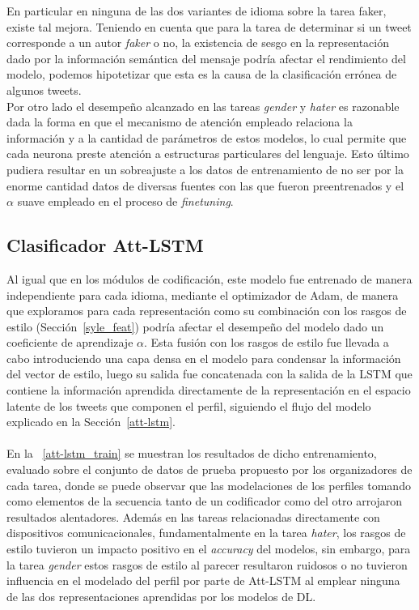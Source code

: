 	En particular en ninguna de las dos variantes de idioma sobre la tarea faker, existe tal mejora. Teniendo en cuenta que para la tarea de determinar si un tweet corresponde a un autor \textit{faker} o no, la existencia de sesgo en la representación dado por la información semántica del mensaje podría afectar el rendimiento del modelo, podemos hipotetizar que esta es la causa de la clasificación errónea de algunos tweets. \\
	Por otro lado el desempeño alcanzado en las tareas \textit{gender} y \textit{hater} es razonable dada la forma en que el mecanismo de atención empleado relaciona la información y a la cantidad de parámetros de estos modelos, lo cual permite que cada neurona  preste atención a estructuras particulares del lenguaje. Esto último pudiera resultar en un sobreajuste a los datos de entrenamiento de no ser por la enorme cantidad datos de diversas fuentes con las que fueron preentrenados y el $\alpha$ suave empleado en el proceso de \textit{finetuning}. 
	
	
	\subsection{Clasificador Att-LSTM}\label{t_attlstm}
	
	Al igual que en los módulos de codificación, este modelo fue entrenado de manera independiente para cada idioma, mediante el optimizador de Adam, de manera que exploramos para cada representación como su combinación con los rasgos de estilo (Sección~\ref{syle_feat}) podría afectar el desempeño del modelo dado un coeficiente de aprendizaje $\alpha$. Esta fusión con los rasgos de estilo fue llevada a cabo introduciendo una capa densa en el modelo para condensar la información del vector de estilo, luego su salida fue concatenada con la salida de la LSTM que contiene la información aprendida directamente de la representación en el espacio latente de los tweets que componen el perfil, siguiendo el flujo del modelo explicado en la Sección~\ref{att-lstm}.
	\\\\
	En la \tablename~\ref{att-lstm_train} se muestran los resultados de dicho entrenamiento, evaluado sobre el conjunto de datos de prueba propuesto por los organizadores de cada tarea, donde se puede observar que las modelaciones de los perfiles tomando como elementos de la secuencia tanto de un codificador como del otro arrojaron resultados alentadores. Además en las tareas relacionadas directamente con dispositivos comunicacionales, fundamentalmente en la tarea \textit{hater}, los rasgos de estilo tuvieron un impacto positivo en el \textit{accuracy} del modelos, sin embargo, para la tarea \textit{gender} estos rasgos de estilo al parecer resultaron ruidosos o no  tuvieron influencia en el modelado del perfil por parte de Att-LSTM al emplear ninguna de las dos representaciones aprendidas por los modelos de DL.
	
